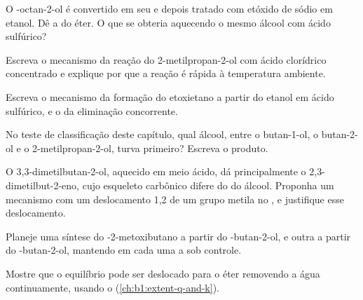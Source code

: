 \begin{exercise}[$\star\star$]\label{exo:b1:alcohol-activation:6}
O -octan-2-ol é convertido em seu  e depois tratado com
etóxido de sódio em etanol. Dê a  do éter. O que se
obteria aquecendo o mesmo álcool com ácido sulfúrico?
\end{exercise}

\begin{exercise}[$\star\star$]\label{exo:b1:alcohol-activation:7}
Escreva o mecanismo da reação do 2-metilpropan-2-ol com ácido clorídrico
concentrado e explique por que a reação é rápida à temperatura
ambiente.
\end{exercise}

\begin{exercise}[$\star\star$]\label{exo:b1:alcohol-activation:8}
Escreva o mecanismo da formação do etoxietano a partir do etanol em
ácido sulfúrico, e o da eliminação concorrente.
\end{exercise}

\begin{exercise}[$\star\star$]\label{exo:b1:alcohol-activation:9}
No teste de classificação deste capítulo, qual álcool, entre o
butan-1-ol, o butan-2-ol e o 2-metilpropan-2-ol, turva primeiro? Escreva
o produto.
\end{exercise}

\begin{exercise}[$\star\star\star$]\label{exo:b1:alcohol-activation:10}
O 3,3-dimetilbutan-2-ol, aquecido em meio ácido, dá principalmente o
2,3-dimetilbut-2-eno, cujo esqueleto carbônico difere do do álcool.
Proponha um mecanismo com um deslocamento 1,2 de um grupo metila no
, e justifique esse deslocamento.
\end{exercise}

\begin{exercise}[$\star\star\star$]\label{exo:b1:alcohol-activation:11}
Planeje uma síntese do -2-metoxibutano a partir do
-butan-2-ol, e outra a partir do -butan-2-ol, mantendo em
cada uma a  sob controle.
\end{exercise}

\begin{exercise}[$\star\star\star$]\label{exo:b1:alcohol-activation:12}
Mostre que o equilíbrio  pode ser
deslocado para o éter removendo a água continuamente, usando o
 (\cref{ch:b1:extent-q-and-k}).
\end{exercise}

